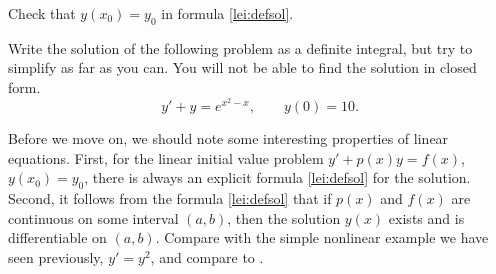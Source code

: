 \documentclass[12pt]{book}
\begin{document}
\begin{exercise}
Check that $y(x_0) = y_0$ in formula \eqref{lei:defsol}.
\end{exercise}

\begin{exercise}
Write the solution of the following problem
as a definite integral, but try to simplify as far as you can.  You will not
be able to find the solution in closed form.
\begin{equation*}
y' + y = e^{x^2-x}, \qquad y(0) = 10 .
\end{equation*}
\end{exercise}

\begin{remark}
Before we move on, we should note some interesting properties of linear
equations.  First, for the linear initial value problem
$y' + p(x) y = f(x)$, $y(x_0) = y_0$,
there is always an explicit formula \eqref{lei:defsol} for the
solution.  Second, it follows
from the formula \eqref{lei:defsol} that if $p(x)$
and $f(x)$ are continuous on some interval $(a,b)$, then the 
solution $y(x)$ exists and is differentiable on $(a,b)$.  Compare
with the simple nonlinear example we have seen previously, $y'=y^2$,
and compare to .
\end{remark}
\end{document}
